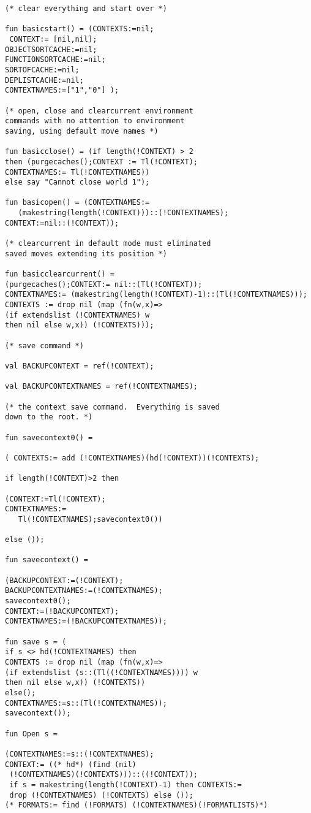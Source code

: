 \documentclass[12pt]{article}
\begin{document}
\begin{verbatim}
(* clear everything and start over *)

fun basicstart() = (CONTEXTS:=nil;
 CONTEXT:= [nil,nil];
OBJECTSORTCACHE:=nil;
FUNCTIONSORTCACHE:=nil;
SORTOFCACHE:=nil;
DEPLISTCACHE:=nil;
CONTEXTNAMES:=["1","0"] );

(* open, close and clearcurrent environment
commands with no attention to environment
saving, using default move names *)

fun basicclose() = (if length(!CONTEXT) > 2 
then (purgecaches();CONTEXT := Tl(!CONTEXT);
CONTEXTNAMES:= Tl(!CONTEXTNAMES)) 
else say "Cannot close world 1");
  
fun basicopen() = (CONTEXTNAMES:=
   (makestring(length(!CONTEXT)))::(!CONTEXTNAMES);
CONTEXT:=nil::(!CONTEXT));

(* clearcurrent in default mode must eliminated
saved moves extending its position *)

fun basicclearcurrent() = 
(purgecaches();CONTEXT:= nil::(Tl(!CONTEXT));
CONTEXTNAMES:= (makestring(length(!CONTEXT)-1)::(Tl(!CONTEXTNAMES)));
CONTEXTS := drop nil (map (fn(w,x)=>
(if extendslist (!CONTEXTNAMES) w 
then nil else w,x)) (!CONTEXTS)));

(* save command *)

val BACKUPCONTEXT = ref(!CONTEXT);

val BACKUPCONTEXTNAMES = ref(!CONTEXTNAMES);

(* the context save command.  Everything is saved
down to the root. *)

fun savecontext0() =

( CONTEXTS:= add (!CONTEXTNAMES)(hd(!CONTEXT))(!CONTEXTS);

if length(!CONTEXT)>2 then

(CONTEXT:=Tl(!CONTEXT); 
CONTEXTNAMES:=
   Tl(!CONTEXTNAMES);savecontext0())

else ());

fun savecontext() =

(BACKUPCONTEXT:=(!CONTEXT);
BACKUPCONTEXTNAMES:=(!CONTEXTNAMES);
savecontext0();
CONTEXT:=(!BACKUPCONTEXT);
CONTEXTNAMES:=(!BACKUPCONTEXTNAMES));

fun save s = (
if s <> hd(!CONTEXTNAMES) then
CONTEXTS := drop nil (map (fn(w,x)=>
(if extendslist (s::(Tl((!CONTEXTNAMES)))) w 
then nil else w,x)) (!CONTEXTS))
else();
CONTEXTNAMES:=s::(Tl(!CONTEXTNAMES));
savecontext());

fun Open s =

(CONTEXTNAMES:=s::(!CONTEXTNAMES);
CONTEXT:= ((* hd*) (find (nil)
 (!CONTEXTNAMES)(!CONTEXTS)))::((!CONTEXT));
 if s = makestring(length(!CONTEXT)-1) then CONTEXTS:=
 drop (!CONTEXTNAMES) (!CONTEXTS) else ());
(* FORMATS:= find (!FORMATS) (!CONTEXTNAMES)(!FORMATLISTS)*) 


\end{verbatim}
\end{document}
